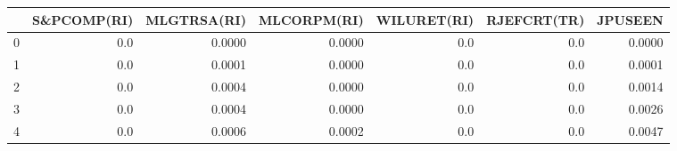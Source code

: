 \begin{tabular}{lrrrrrr}
\toprule
{} &  S\&PCOMP(RI) &  MLGTRSA(RI) &  MLCORPM(RI) &  WILURET(RI) &  RJEFCRT(TR) &  JPUSEEN \\
\midrule
0 &          0.0 &       0.0000 &       0.0000 &          0.0 &          0.0 &   0.0000 \\
1 &          0.0 &       0.0001 &       0.0000 &          0.0 &          0.0 &   0.0001 \\
2 &          0.0 &       0.0004 &       0.0000 &          0.0 &          0.0 &   0.0014 \\
3 &          0.0 &       0.0004 &       0.0000 &          0.0 &          0.0 &   0.0026 \\
4 &          0.0 &       0.0006 &       0.0002 &          0.0 &          0.0 &   0.0047 \\
\bottomrule
\end{tabular}
